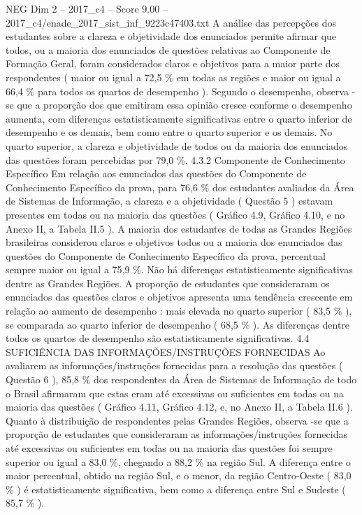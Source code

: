 \begin{textsample}{NEG Dim 2 – 2017\_c4 – Score 9.00 – 2017\_c4/enade\_2017\_sist\_inf\_9223c47403.txt}
A análise das percepções dos estudantes sobre a clareza e objetividade dos enunciados permite afirmar que todos, ou a maioria dos enunciados de questões relativas ao Componente de Formação Geral, foram considerados claros e objetivos para a maior parte dos respondentes ( maior ou igual a 72,5 \% em todas as regiões e maior ou igual a 66,4 \% para todos os quartos de desempenho ).
Segundo o desempenho, observa -se que a proporção dos que emitiram essa opinião cresce conforme o desempenho aumenta, com diferenças estatisticamente significativas entre o quarto inferior de desempenho e os demais, bem como entre o quarto superior e os demais.
No quarto superior, a clareza e objetividade de todos ou da maioria dos enunciados das questões foram percebidas por 79,0 \%. 4.3.2 Componente de Conhecimento Específico Em relação aos enunciados das questões do Componente de Conhecimento Específico da prova, para 76,6 \% dos estudantes avaliados da Área de Sistemas de Informação, a clareza e a objetividade ( Questão 5 ) estavam presentes em todas ou na maioria das questões ( Gráfico 4.9, Gráfico 4.10, e no Anexo II, a Tabela II.5 ).
A maioria dos estudantes de todas as Grandes Regiões brasileiras considerou claros e objetivos todos ou a maioria dos enunciados das questões do Componente de Conhecimento Específico da prova, percentual sempre maior ou igual a 75,9 \%.
Não há diferenças estatisticamente significativas dentre as Grandes Regiões.
A proporção de estudantes que consideraram os enunciados das questões claros e objetivos apresenta uma tendência crescente em relação ao aumento de desempenho : mais elevada no quarto superior ( 83,5 \% ), se comparada ao quarto inferior de desempenho ( 68,5 \% ).
As diferenças dentre todos os quartos de desempenho são estatisticamente significativas. 4.4 SUFICIÊNCIA DAS INFORMAÇÕES/INSTRUÇÕES FORNECIDAS Ao avaliarem as informações/instruções fornecidas para a resolução das questões ( Questão 6 ), 85,8 \% dos respondentes da Área de Sistemas de Informação de todo o Brasil afirmaram que estas eram até excessivas ou suficientes em todas ou na maioria das questões ( Gráfico 4.11, Gráfico 4.12, e, no Anexo II, a Tabela II.6 ).
Quanto à distribuição de respondentes pelas Grandes Regiões, observa -se que a proporção de estudantes que consideraram as informações/instruções fornecidas até excessivas ou suficientes em todas ou na maioria das questões foi sempre superior ou igual a 83,0 \%, chegando a 88,2 \% na região Sul.
A diferença entre o maior percentual, obtido na região Sul, e o menor, da região Centro-Oeste ( 83,0 \% ) é estatisticamente significativa, bem como a diferença entre Sul e Sudeste ( 85,7 \% ).

\end{textsample}
